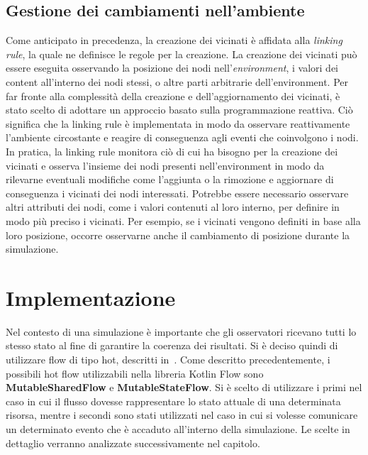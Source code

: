 \documentclass[12pt,a4paper,openright,twoside]{book}
\begin{document}
\subsection{Gestione dei cambiamenti nell'ambiente}
\label{sec:linking-rule}
Come anticipato in precedenza, la creazione dei vicinati è affidata alla \textit{linking rule}, la quale ne definisce le regole per la creazione. La creazione dei vicinati può essere eseguita osservando la posizione dei nodi nell'\textit{environment}, i valori dei content all'interno dei nodi stessi, o altre parti arbitrarie dell'environment. 
Per far fronte alla complessità della creazione e dell'aggiornamento dei vicinati, è stato scelto di adottare un approccio basato sulla programmazione reattiva. Ciò significa che la linking rule è implementata in modo da osservare reattivamente l'ambiente circostante e reagire di conseguenza agli eventi che coinvolgono i nodi.
In pratica, la linking rule monitora ciò di cui ha bisogno per la creazione dei vicinati e osserva l'insieme dei nodi presenti nell'environment in modo da rilevarne eventuali modifiche come l'aggiunta o la rimozione e aggiornare di conseguenza i vicinati dei nodi interessati. Potrebbe essere necessario osservare altri attributi dei nodi, come i valori contenuti al loro interno, per definire in modo più preciso i vicinati.
Per esempio, se i vicinati vengono definiti in base alla loro posizione, occorre osservarne anche il cambiamento di posizione durante la simulazione.

\section{Implementazione}
Nel contesto di una simulazione è importante che gli osservatori ricevano tutti lo stesso stato al fine di garantire la coerenza dei risultati. Si è deciso quindi di utilizzare flow di tipo hot, descritti in~. 
Come descritto precedentemente, i possibili hot flow utilizzabili nella libreria Kotlin Flow sono \textbf{MutableSharedFlow} e \textbf{MutableStateFlow}. Si è scelto di utilizzare i primi nel caso in cui il flusso dovesse rappresentare lo stato attuale di una determinata risorsa, mentre i secondi sono stati utilizzati nel caso in cui si volesse comunicare un determinato evento che è accaduto all'interno della simulazione. Le scelte in dettaglio verranno analizzate successivamente nel capitolo. 
\end{document}
